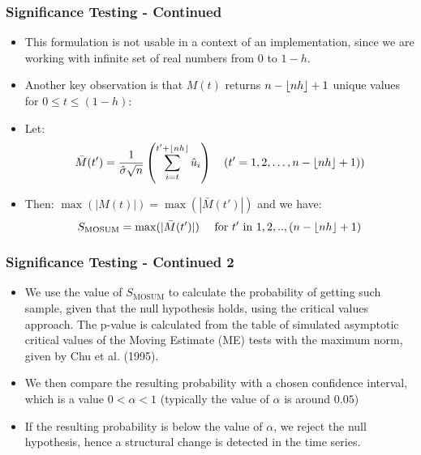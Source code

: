 \documentclass[presentation.tex]{subfiles}
\begin{document}
\begin{frame}
  \frametitle{Significance Testing - Continued}
  \begin{itemize}
  \item This formulation is not usable in a context of an implementation, since we are working
    with infinite set of real numbers from $0$ to $1-h$.
  \item Another key observation is that $M(t)$ returns $n - \lfloor nh\rfloor + 1$ unique values for $0 \leq t \leq (1-h)$:
  \item Let:
    \begin{equation} \label{eq:mosum}
      \bar{M}(t') =
      \frac{1}{\hat{\sigma} \sqrt{n}}
      \left(\sum_{i=t}^{t' + \lfloor nh\rfloor} \hat{u}_i\right)
      \quad(t' = 1,2, \hdots, n - \lfloor nh\rfloor + 1))
    \end{equation}
  \item Then: 
    $\max(|M(t)|) = \max(|\bar{M}(t')|)$ and we have:
    \begin{equation} \label{eq:test_statistic}
      S_{\text{MOSUM}} = \max(|\bar{M}(t')|) \quad \text{ for } t' \text{ in } 1,2,..,(n - \lfloor nh\rfloor + 1)
    \end{equation}
  \end{itemize}
\end{frame}

\begin{frame}
  \frametitle{Significance Testing - Continued 2}
  \begin{itemize}
  \item We use the value of $S_{\text{MOSUM}}$ to calculate the probability of getting such
    sample, given that the null hypothesis holds, using the critical values approach.
    The p-value is calculated from the table of
    simulated asymptotic critical values of the Moving Estimate (ME) tests with
    the maximum norm, given by Chu et al. (1995).
  \item  We then compare the resulting
    probability with a chosen confidence interval, which is a value $0 < \alpha < 1$
    (typically the value of $\alpha$ is around $0.05$)
    \item If the resulting probability is below the
      value of $\alpha$, we reject the null hypothesis, hence a 
      structural change is detected in the time series. 
  \end{itemize}
\end{frame}
\end{document}
